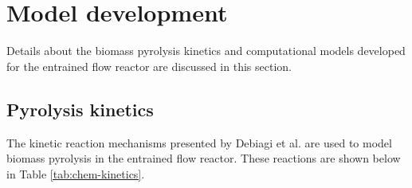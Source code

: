 
\section{Model development}

Details about the biomass pyrolysis kinetics and computational models developed for the entrained flow reactor are discussed in this section.

\subsection{Pyrolysis kinetics}

The kinetic reaction mechanisms presented by Debiagi et al. are used to model biomass pyrolysis in the entrained flow reactor. These reactions are shown below in Table \ref{tab:chem-kinetics}.

